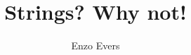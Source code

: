 \documentclass{book}
\title{Strings? Why not!}
\author{Enzo Evers}
\begin{document}
\maketitle

\tableofcontents


\newpage

\newpage

\newpage

\newpage



\printbibliography

\begin{appendices}

\end{appendices}
\end{document}
